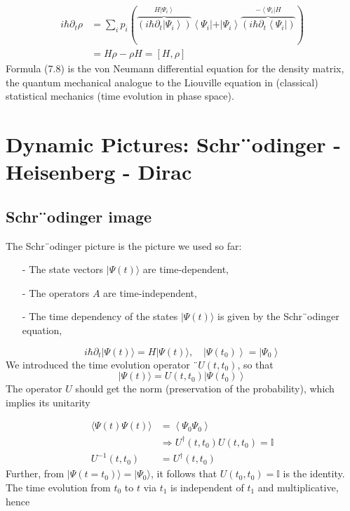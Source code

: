 \begin{equation}
\begin{aligned} i \hbar \partial_{t} \rho &=\sum_{i} p_{i}\left(\overbrace{\left(i \hbar \partial_{t}\left|\Psi_{i}\right\rangle\right)}^{H\left|\Psi_{i}\right\rangle}\left\langle\Psi_{i}|+| \Psi_{i}\right\rangle \overbrace{\left(i \hbar \partial_{t}\left\langle\Psi_{i}\right|\right)}^{-\left\langle\Psi_{i}\right| H}\right) \\ &=H \rho-\rho H=[H, \rho] \end{aligned}
\end{equation}
Formula (7.8) is the von Neumann differential equation for the density matrix, the quantum mechanical analogue to the Liouville equation in (classical) statistical mechanics (time evolution in phase space).

\section{Dynamic Pictures: Schr¨odinger - Heisenberg - Dirac}
\subsection{Schr¨odinger image}
The Schr¨odinger picture is the picture we used so far: 
\begin{enumerate}
    \item[-] The state vectors $|\Psi(t)\rangle$ are time-dependent,
    \item[-] The operators $A$ are time-independent,
    \item[-] The time dependency of the states $|\Psi(t)\rangle$ is given by the Schr¨odinger equation, 
\end{enumerate}

\begin{equation}
    i \hbar \partial_{t}|\Psi(t)\rangle= H|\Psi(t)\rangle, \quad\left|\Psi\left(t_{0}\right)\right\rangle=\left|\Psi_{0}\right\rangle
    \end{equation}
We introduced the time evolution operator ¨$U (t, t_0)$, so that
\begin{equation}
    |\Psi(t)\rangle= U\left(t, t_{0}\right)\left|\Psi\left(t_{0}\right)\right\rangle
    \end{equation}
The operator $U$ should get the norm (preservation of the probability), which implies its unitarity

\begin{align}\langle\Psi(t) \Psi(t)\rangle &=\left\langle\Psi_{0} \Psi_{0}\right\rangle \\ & \Rightarrow U^{\dagger}\left(t, t_{0}\right) U\left(t, t_{0}\right)=\mathbb{I} \\ U^{-1}\left(t, t_{0}\right) &=U^{\dagger}\left(t, t_{0}\right) 
\end{align}
Further, from $|\Psi(t=t_0)\rangle=|\Psi_0\rangle$, it follows that $U (t_0, t_0) = \mathbb{I}$ is the identity. The time evolution from $t_0$ to $t$ via $t_1$ is independent of $t_1$ and multiplicative, hence

